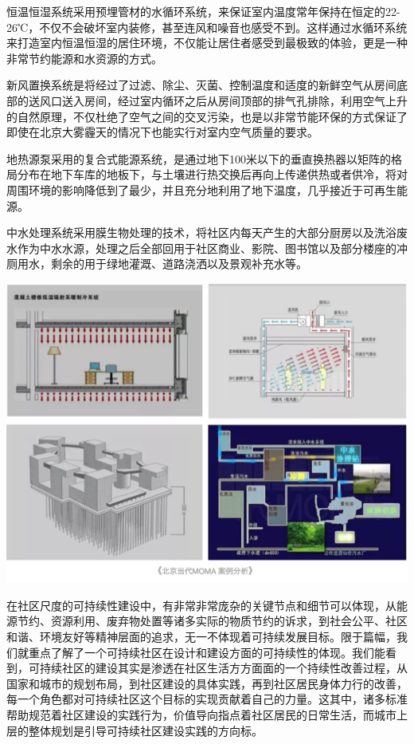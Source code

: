 \documentclass[]{book}
\begin{document}
恒温恒湿系统采用预埋管材的水循环系统，来保证室内温度常年保持在恒定的22-26℃，不仅不会破坏室内装修，甚至连风和噪音也感受不到。这样通过水循环系统来打造室内恒温恒湿的居住环境，不仅能让居住者感受到最极致的体验，更是一种非常节约能源和水资源的方式。

新风置换系统是将经过了过滤、除尘、灭菌、控制温度和适度的新鲜空气从房间底部的送风口送入房间，经过室内循环之后从房间顶部的排气孔排除，利用空气上升的自然原理，不仅杜绝了空气之间的交叉污染，也是以非常节能环保的方式保证了即使在北京大雾霾天的情况下也能实行对室内空气质量的要求。

地热源泵采用的复合式能源系统，是通过地下100米以下的垂直换热器以矩阵的格局分布在地下车库的地板下，与土壤进行热交换后再向上传递供热或者供冷，将对周围环境的影响降低到了最少，并且充分地利用了地下温度，几乎接近于可再生能源。

中水处理系统采用膜生物处理的技术，将社区内每天产生的大部分厨房以及洗浴废水作为中水水源，处理之后全部回用于社区商业、影院、图书馆以及部分楼座的冲厕用水，剩余的用于绿地灌溉、道路浇洒以及景观补充水等。

\includegraphics[width=8.33in]{images/moma6}

在社区尺度的可持续性建设中，有非常非常庞杂的关键节点和细节可以体现，从能源节约、资源利用、废弃物处置等诸多实际的物质节约的诉求，到社会公平、社区和谐、环境友好等精神层面的追求，无一不体现着可持续发展目标。限于篇幅，我们就重点了解了一个可持续社区在设计和建设方面的可持续性的体现。我们能看到，可持续社区的建设其实是渗透在社区生活方方面面的一个持续性改善过程，从国家和城市的规划布局，到社区建设的具体实践，再到社区居民身体力行的改善，每一个角色都对可持续社区这个目标的实现贡献着自己的力量。这其中，诸多标准帮助规范着社区建设的实践行为，价值导向指点着社区居民的日常生活，而城市上层的整体规划是引导可持续社区建设实践的方向标。
\end{document}
